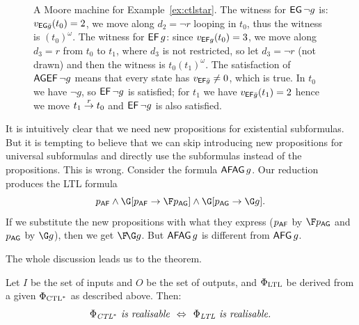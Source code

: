 \begin{example}
\begin{figure}[bt]
\caption{A Moore machine for Example~\ref{ex:ctlstar}.
The witness for $\operatorname{\mathsf{EG}}\neg g$ is:
$v_{\operatorname{\mathsf{EG}}\!\bar{g}}(t_0)=2$, we move along $d_2=\neg r$ looping in $t_0$, thus the witness is $(t_0)^\omega$.
The witness for $\operatorname{\mathsf{EF}} g$:
since $v_{\operatorname{\mathsf{EF}}\!g}(t_0)=3$, we move along $d_3=r$ from $t_0$ to $t_1$,
where $d_3$ is not restricted, so let $d_3=\neg r$ (not drawn) and then the witness is $t_0 (t_1)^\omega$.
The satisfaction of $\operatorname{\mathsf{AGEF}} \neg g$ means that every state has $v_{\operatorname{\mathsf{EF}}\!\bar{g}} \neq 0$, which is true.
In $t_0$ we have $\neg g$, so $\operatorname{\mathsf{EF}} \neg g$ is satisfied;
for $t_1$ we have $v_{\operatorname{\mathsf{EF}}\!\bar{g}}(t_1)=2$ hence we move $t_1 \stackrel{{r}}{\rightarrow} t_0$ and $\operatorname{\mathsf{EF}} \neg g$ is also satisfied.
}
\label{fig:ctlstar:system}
\end{figure}
\end{example}

\begin{remark}
It is intuitively clear that we need new propositions for existential subformulas.
But it is tempting to believe that we can skip introducing new propositions for universal subformulas
and directly use the subformulas instead of the propositions.
This is wrong.
Consider the \CTLstar formula $\operatorname{\mathsf{AFAG}} g$.
Our reduction produces the LTL formula
$$
p_{\AF} \land \G [p_{\AF} \impl \F p_{\AG}] \land \G [p_{\AG} \impl \G g].
$$
If we substitute the new propositions with what they express ($p_{\operatorname{\mathsf{AF}}}$ by $\F p_{\AG}$ and $p_{\operatorname{\mathsf{AG}}}$ by $\G g$),
then we get $\FG g$.
But $\operatorname{\mathsf{AFAG}} g$ is different from $\operatorname{\mathsf{AFG}} g$.
\end{remark}


\smallskip

The whole discussion leads us to the theorem.
\begin{theorem}
  Let $I$ be the set of inputs and $O$ be the set of outputs,
  and $\Phi_\text{LTL}$ be derived from a given $\Phi_{\text{CTL}^*}$ as described above.
  Then:
  $$
  \textit{
  $\Phi_{\text{CTL}^*}$ is realisable
  $~\Leftrightarrow~$
  $\Phi_\text{LTL}$ is realisable.
  }
  $$
\end{theorem}



